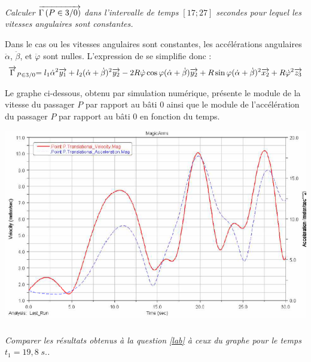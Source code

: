 \documentclass[10pt,fleqn]{article} %
\begin{document}
\begin{multicols}{2}
\begin{corrige}
\end{corrige}\else\fi

\subparagraph{}
\textit{Calculer $\overrightarrow{\Gamma\left(P\in3/0 \right)}$ dans l'intervalle de temps $[17;27]$ secondes pour lequel les vitesses angulaires sont constantes.}
\ifprof
\begin{corrige}

Dans le cas ou les vitesses angulaires sont constantes, les accélérations angulaires $\ddot\alpha$, $\ddot\beta$, et $\ddot\varphi$ sont nulles. L'expression de  se simplifie donc :
\begin{align*}
{\ensuremath{\overrightarrow{\Gamma}_{P \in 3 / 0}}}{=l_1 \dot\alpha^2\overrightarrow{y_{1}} + l_2(\dot\alpha+\dot\beta)^2\overrightarrow{y_2}-2R\dot\varphi\cos\varphi(\dot\alpha+\dot\beta)\overrightarrow{y_2}+ R\sin\varphi(\dot\alpha+\dot\beta)^2\overrightarrow{x_2} +R\dot\varphi^2\overrightarrow{z_3}}\\
\end{align*}

\end{corrige}\else\fi

\vspace{.3cm}

Le graphe ci-dessous, obtenu par simulation numérique, présente le module de la vitesse du passager $P$ par rapport au bâti 0 ainsi que le module de l'accélération du passager $P$ par rapport au bâti 0 en fonction du temps. 
\begin{center}
\includegraphics[width=\linewidth]{images/img3}
\end{center}

\subparagraph{}
\textit{Comparer les résultats obtenus à la question \ref{lab} à ceux du graphe pour le temps $t_1=19,8\;s.$.}
\ifprof
\begin{corrige}


\end{corrige}
\end{multicols}
\end{document}
